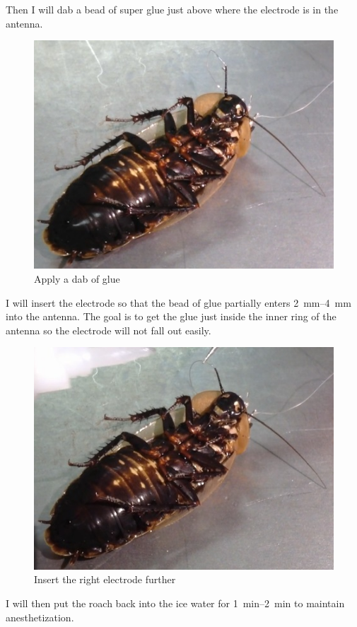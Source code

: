 Then I will dab a bead of super glue just above where the electrode is in the antenna. 
{\begin{figure}[ht!]
\centering
\includegraphics[scale=0.3]{Surgery Photos/relectrodeglue.jpg}
\caption{Apply a dab of glue}
\label{fig:relectrodeglue}
\end{figure}}
I will insert the electrode so that the bead of glue partially enters \SIrange{2}{4}{\milli\meter} into the antenna. The goal is to get the glue just inside the inner ring of the antenna so the electrode will not fall out easily. 
{\begin{figure}[ht!]
\centering
\includegraphics[scale=0.3]{Surgery Photos/relectrode2.jpg}
\caption{Insert the right electrode further}
\label{fig:relectrode2}
\end{figure}}
I will then put the roach back into the ice water for \SIrange{1}{2}{\minute} to maintain anesthetization.

